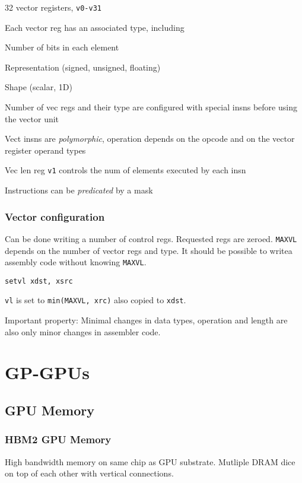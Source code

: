 \documentclass[a4paper, fontsize=8pt, landscape, DIV=1]{scrartcl}
\makeatletter
\renewenvironment{outline}[1][]{%
  \ifthenelse{\equal{#1}{}}{}{\renewcommand{\ol@type}{#1}}%
  \ol@z%
  \newcommand{\0}{\ol@toz\ol@z}%
  \newcommand{\1}{\vspace{\dimexpr\outlinespacingscalar\baselineskip-\baselineskip}\ol@toi\ol@i\item}%
  \newcommand{\2}{\vspace{\dimexpr\outlinespacingscalartwo\baselineskip-\baselineskip}\ol@toii\ol@ii\item}%
  \newcommand{\3}{\vspace{\dimexpr\outlinespacingscalar\baselineskip-\baselineskip}\ol@toiii\ol@iii\item}%
  \newcommand{\4}{\vspace{\dimexpr\outlinespacingscalar\baselineskip-\baselineskip}\ol@toiiii\ol@iiii\item}%
}{%
  \ol@toz\ol@exit%
}
\def\outlinespacingscalar{0.5}
\def\outlinespacingscalartwo{0.5}
\makeatother
\begin{document}
\begin{multicols*}{4}
  \begin{outline}
    \1 32 vector registers, \texttt{v0-v31}
    \1 Each vector reg has an associated type, including
      \2 Number of bits in each element
      \2 Representation (signed, unsigned, floating)
      \2 Shape (scalar, 1D)
    \1 Number of vec regs and their type are configured with special insns before
    using the vector unit
    \1 Vect insns are \textit{polymorphic}, operation depends on the opcode and on the
    vector register operand types
    \1 Vec len reg \texttt{v1} controls the num of elements executed by each insn
    \1 Instructions can be \textit{predicated} by a mask
  \end{outline}

  \subsubsection{Vector configuration}
  Can be done writing a number of control regs. Requested regs are zeroed. \texttt{MAXVL}
  depends on the number of vector regs and type. It should be possible to writea assembly
  code without knowing \texttt{MAXVL}.
  
  \begin{lstlisting}[language={[x86masm]Assembler}]
setvl xdst, xsrc\end{lstlisting}
  \texttt{vl} is set to \texttt{min(MAXVL, xrc)} also copied to \texttt{xdst}.


  Important property: Minimal changes in data types, operation and length are also
  only minor changes in assembler code.

  \section{GP-GPUs}
  \subsection{GPU Memory}
  \subsubsection{HBM2 GPU Memory}
  High bandwidth memory on same chip as GPU substrate. Mutliple DRAM dice on top
   of each other with vertical connections.
  

\end{multicols*}
\end{document}

